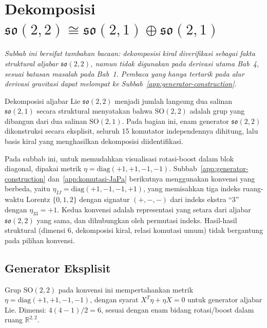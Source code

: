 \section{Dekomposisi $\mathfrak{so}(2,2) \cong \mathfrak{so}(2,1) \oplus \mathfrak{so}(2,1)$}
\label{app:SO22-decomp}

\noindent\textit{Subbab ini bersifat tambahan bacaan: dekomposisi kiral diverifikasi sebagai fakta struktural aljabar $\mathfrak{so}(2,2)$, namun tidak digunakan pada derivasi utama Bab~4, sesuai batasan masalah pada Bab~1. Pembaca yang hanya tertarik pada alur derivasi gravitasi dapat melompat ke Subbab~\ref{app:generator-construction}.}

Dekomposisi aljabar Lie $\mathfrak{so}(2,2)$ menjadi jumlah langsung dua salinan $\mathfrak{so}(2,1)$ secara struktural menyatakan bahwa $\mathrm{SO}(2,2)$ adalah grup yang dibangun dari dua salinan $\mathrm{SO}(2,1)$. Pada bagian ini, enam generator $\mathfrak{so}(2,2)$ dikonstruksi secara eksplisit, seluruh 15 komutator independennya dihitung, lalu basis kiral yang menghasilkan dekomposisi diidentifikasi.

\vspace{0.5em}
Pada subbab ini, untuk memudahkan visualisasi rotasi-boost dalam blok diagonal, dipakai metrik $\eta = \mathrm{diag}(+1,+1,-1,-1)$. Subbab~\ref{app:generator-construction} dan~\ref{app:komutasi-JaPa} berikutnya menggunakan konvensi yang berbeda, yaitu $\eta_{IJ} = \mathrm{diag}(+1,-1,-1,+1)$, yang memisahkan tiga indeks ruang-waktu Lorentz $\{0,1,2\}$ dengan signatur $(+,-,-)$ dari indeks ekstra ``3'' dengan $\eta_{33} = +1$. Kedua konvensi adalah representasi yang setara dari aljabar $\mathfrak{so}(2,2)$ yang sama, dan dihubungkan oleh permutasi indeks. Hasil-hasil struktural (dimensi 6, dekomposisi kiral, relasi komutasi umum) tidak bergantung pada pilihan konvensi.

\subsection{Generator Eksplisit}

Grup $\mathrm{SO}(2,2)$ pada konvensi ini mempertahankan metrik $\eta = \mathrm{diag}(+1,+1,-1,-1)$, dengan syarat $X^T\eta + \eta X = 0$ untuk generator aljabar Lie. Dimensi: $4(4-1)/2 = 6$, sesuai dengan enam bidang rotasi/boost dalam ruang $\mathbb{R}^{2,2}$.

